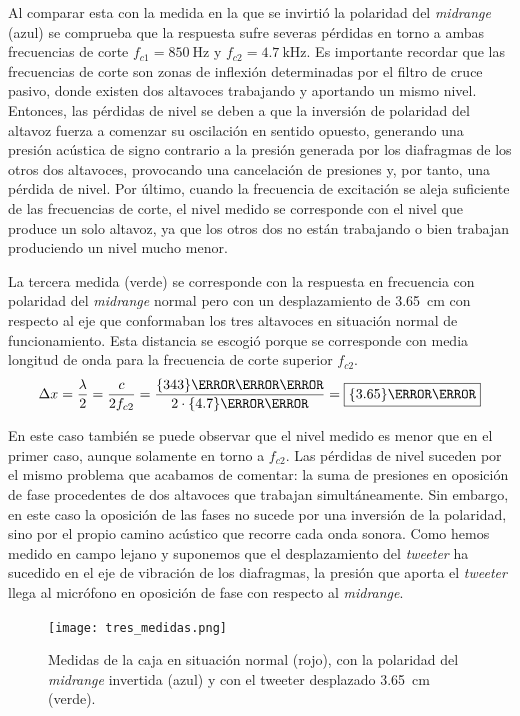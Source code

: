 \documentclass[10pt]{article}
\begin{document}
Al comparar esta con la medida en la que se invirtió la polaridad del \textit{midrange} (azul) se comprueba que la respuesta sufre severas pérdidas en torno a ambas frecuencias de corte $f_{c1} = \qty{850}{\hertz }$ y $f_{c2} = \qty{4.7}{\kilo\hertz }$. Es importante recordar que las frecuencias de corte son zonas de inflexión determinadas por el filtro de cruce pasivo, donde existen dos altavoces trabajando y aportando un mismo nivel. Entonces, las pérdidas de nivel se deben a que la inversión de polaridad del altavoz fuerza a comenzar su oscilación en sentido opuesto, generando una presión acústica de signo contrario a la presión generada por los diafragmas de los otros dos altavoces, provocando una cancelación de presiones y, por tanto, una pérdida de nivel. Por último, cuando la frecuencia de excitación se aleja suficiente de las frecuencias de corte, el nivel medido se corresponde con el nivel que produce un solo altavoz, ya que los otros dos no están trabajando o bien trabajan produciendo un nivel mucho menor.

La tercera medida (verde) se corresponde con la respuesta en frecuencia con polaridad del \textit{midrange} normal pero con un desplazamiento de \qty{3.65}{\centi\metre} con respecto al eje que conformaban los tres altavoces en situación normal de funcionamiento. Esta distancia se escogió porque se corresponde con media longitud de onda para la frecuencia de corte superior $f_{c2}$.
\begin{equation} \label{eq:delta_x}
  \Delta x = \frac{\lambda }{2} = \frac{c}{2f_{c2}} = \frac{\qty{343}{\metre \per \second}}{2 \cdot \qty{4.
      7}{\kilo\hertz }} = \boxed{\qty{3.65}{\centi\meter}}
\end{equation}

En este caso también se puede observar que el nivel medido es menor que en el primer caso, aunque solamente en torno a $f_{c2}$. Las pérdidas de nivel suceden por el mismo problema que acabamos de comentar: la suma de presiones en oposición de fase procedentes de dos altavoces que trabajan simultáneamente. Sin embargo, en este caso la oposición de las fases no sucede por una inversión de la polaridad, sino por el propio camino acústico que recorre cada onda sonora. Como hemos medido en campo lejano y suponemos que el desplazamiento del \textit{tweeter} ha sucedido en el eje de vibración de los diafragmas, la presión que aporta el \textit{tweeter} llega al micrófono en oposición de fase con respecto al \textit{midrange}.

\begin{figure}[htp]
  \centering
  \texttt{[image: tres\_medidas.png]}
  \caption{Medidas de la caja en situación normal (rojo), con la polaridad del \textit{midrange} invertida (azul) y con el tweeter desplazado \qty{3.65}{\centi\metre} (verde).}
  \label{fig:tres_medidas}
\end{figure}
\end{document}

